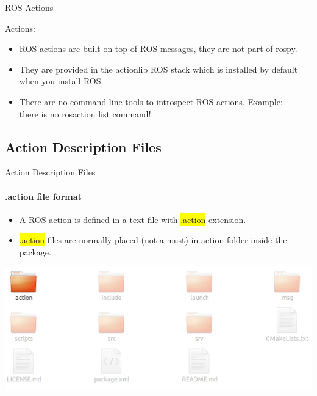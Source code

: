 \documentclass{beamer}
\begin{document}
\begin{frame}{ROS Actions}
    
    {\huge Actions:}
    \vspace{0.2cm}
    \begin{itemize}
        
        
        \item ROS actions are built on top of ROS messages, they are not part of {\ttfamily \colorbox{gray!30!white}{\href{https://docs.ros.org/kinetic/api/rospy/html/}{rospy}}}. 
        
        \vspace{3mm}
        
        \item They are provided in the {\ttfamily \colorbox{gray!30!white}{actionlib}} ROS stack which is installed by default when you install ROS.
        
        \vspace{3mm}
        
        \item There are no command-line tools to introspect ROS actions. Example: \\ \vspace{2mm}  there is no {\ttfamily \colorbox{gray!30!white}{rosaction list}} command!
    \end{itemize}  
\end{frame}




\subsection{Action Description Files}

\begin{frame}{Action Description Files}
    \framesubtitle{.action file format}
    \begin{itemize}
        \item A ROS action is defined in a text file with  {\ttfamily \colorbox{yellow}{.action}} extension.
        \item {\ttfamily \colorbox{yellow}{.action}} files are normally placed (not a must) in {\ttfamily \colorbox{gray!30!white}{action}} folder inside the package.
    \end{itemize}
    \vspace{2mm}
    \includegraphics[width=1\linewidth]{figures/package.png}
\end{frame}
\end{document}

